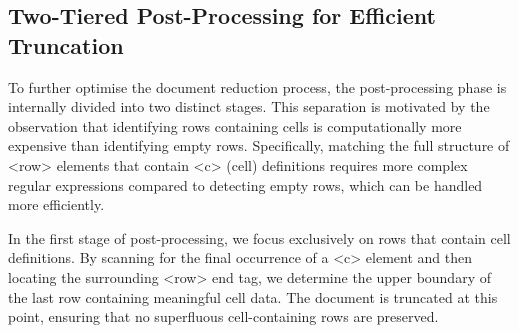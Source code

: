 %    
%






\subsection{Two-Tiered Post-Processing for Efficient Truncation}


To further optimise the document reduction process,
the post-processing phase is internally divided into two distinct stages.
This separation is motivated by the observation
that identifying rows containing cells is computationally more expensive
than identifying empty rows.
Specifically, matching the full structure of <row> elements
that contain <c> (cell) definitions requires more complex regular expressions
compared to detecting empty rows, which can be handled more efficiently.

In the first stage of post-processing,
we focus exclusively on rows that contain cell definitions.
By scanning for the final occurrence of a <c> element
and then locating the surrounding <row> end tag,
we determine the upper boundary of the last row containing meaningful cell data.
The document is truncated at this point, ensuring that no superfluous cell-containing rows are preserved.

